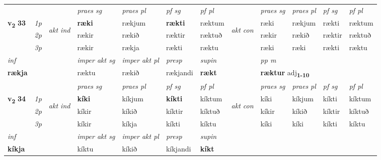 \begin{longtable}[l]{X>{\footnotesize\itshape}llXXXXlXXXX}
\midrule

 & &   & \textit{praes sg}  & \textit{praes pl}    & \textit{ pf sg} & \textit{pf pl} & & \textit{praes sg}  & \textit{praes pl}    & \textit{pf sg} & \textit{pf pl }  \\ \cmidrule{4-7} \cmidrule{9-12}
 \multirow{2}{*}{{{\textbf{v{\textsubscript{2}}} \Large{\textbf{33}}}}}  & 1p & \multirow{3}{*}{\begin{turn}{90}\textit{akt ind}\end{turn}} & \textbf{ræki} & rækjum & \textbf{rækti} & ræktum & \multirow{3}{*}{\begin{turn}{90}\textit{akt con}\end{turn}} &ræki & rækjum & rækti & ræktum\\*
 & 2p &  &  rækir  & rækið & ræktir & ræktuð & & rækir & rækið & ræktir & ræktuð \\*
 & 3p &  & rækir & rækja & rækti & ræktu & & ræki & ræki& rækti & ræktu \\*
\cmidrule{4-7} \cmidrule{9-12}

   {\textit{inf}} & &  & \textit{imper akt sg} & \textit{imper akt pl}   & \textit{presp} & \textit{supin}  && \textit{pp m} \\*
  {\textbf{rækja}} & && ræktu  & rækið   & rækjandi &  \textbf{rækt}  && \multicolumn{2}{l}{\textbf{ræktur} adj\textbf{\textsubscript{1-10}}} \\*

\midrule

 & &   & \textit{praes sg}  & \textit{praes pl}    & \textit{ pf sg} & \textit{pf pl} & & \textit{praes sg}  & \textit{praes pl}    & \textit{pf sg} & \textit{pf pl }  \\ \cmidrule{4-7} \cmidrule{9-12}
 \multirow{2}{*}{{{\textbf{v{\textsubscript{2}}} \Large{\textbf{34}}}}}  & 1p & \multirow{3}{*}{\begin{turn}{90}\textit{akt ind}\end{turn}} & \textbf{kíki} & kíkjum & \textbf{kíkti} & kíktum & \multirow{3}{*}{\begin{turn}{90}\textit{akt con}\end{turn}} &kíki & kíkjum & kíkti & kíktum\\*
 & 2p &  &  kíkir  & kíkið & kíktir & kíktuð & & kíkir & kíkið & kíktir & kíktuð \\*
 & 3p &  & kíkir & kíkja & kíkti & kíktu & & kíki & kíki& kíkti & kíktu \\*
\cmidrule{4-7} \cmidrule{9-12}

   {\textit{inf}} & &  & \textit{imper akt sg} & \textit{imper akt pl}   & \textit{presp} & \textit{supin}   \\*
  {\textbf{kíkja}} & && kíktu  & kíkið   & kíkjandi &  \textbf{kíkt}   \\*


\end{longtable}

